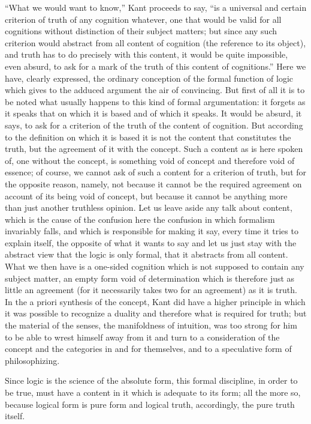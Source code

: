 “What we would want to know,” Kant proceeds to say, 
“is a universal and certain criterion of
truth of any cognition whatever,
one that would be valid for all cognitions
without distinction of their subject matters;
but since any such criterion would abstract from
all content of cognition (the reference to its object),
and truth has to do precisely with this content,
it would be quite impossible, even absurd,
to ask for a mark of the truth 
of this content of cognitions.”
Here we have, clearly expressed, 
the ordinary conception of
the formal function of logic
which gives to the adduced argument
the air of convincing.
But first of all it is to be noted 
what usually happens to this
kind of formal argumentation:
it forgets as it speaks that on which it is based
and of which it speaks.
It would be absurd, it says, to ask for a criterion
of the truth of the content of cognition.
But according to the definition on
which it is based it is not 
the content that constitutes the truth,
but the agreement of it with the concept.
Such a content as is here spoken of,
one without the concept, 
is something void of concept
and therefore void of essence;
of course, we cannot ask of 
such a content for a criterion of truth,
but for the opposite reason, namely,
not because it cannot be the required
agreement on account of its being void of concept,
but because it cannot be anything more than 
just another truthless opinion.
Let us leave aside any talk about content,
which is the cause of the confusion here
the confusion in which formalism invariably falls,
and which is responsible for making it say,
every time it tries to explain itself,
the opposite of what it wants to say
and let us just stay with the abstract view
that the logic is only formal,
that it abstracts from all content.
What we then have is a one-sided cognition
which is not supposed to contain any subject matter,
an empty form void of determination
which is therefore just as little an agreement
(for it necessarily takes two for an agreement)
as it is truth.
In the a priori synthesis of the concept,
Kant did have a higher principle
in which it was possible to recognize a duality
and therefore what is required for truth;
but the material of the senses,
the manifoldness of intuition,
was too strong for him to be able
to wrest himself away from it
and turn to a consideration of the concept
and the categories in and for themselves,
and to a speculative form of philosophizing.

Since logic is the science of the absolute form,
this formal discipline, in order to be true,
must have a content in it which is adequate to its form;
all the more so, because logical form is pure form
and logical truth, accordingly, the pure truth itself.

